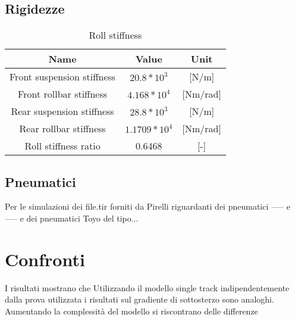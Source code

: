 \subsection{Rigidezze}
\begin{table}[H]
    \centering
    \caption{Roll stiffness}
    \vspace{0.5em}
    \begin{tabular}{ccc}
    \hline
        Name & Value & Unit \\
        \hline
        Front suspension stiffness & $20.8*10^3$ & [N/m]\\
        Front rollbar stiffness & $4.168*10^4$ & [Nm/rad]\\
        Rear suspension stiffness & $28.8*10^3$ & [N/m]\\
        Rear rollbar stiffness & $1.1709*10^4$ & [Nm/rad]\\
        Roll stiffness ratio & 0.6468 & [-]\\
    \hline    
    \end{tabular}
    \label{tab:tabella rigidezze}
\end{table}

\subsection{Pneumatici}
Per le simulazioni dei file.tir forniti da Pirelli riguardanti dei pneumatici ----- e -----
e dei pneumatici Toyo del tipo...

\section{Confronti}
I risultati mostrano che Utilizzando il modello single track
indipendentemente dalla prova utilizzata i risultati sul 
gradiente di sottosterzo sono analoghi.
Aumentando la complessità del modello si riscontrano delle differenze
